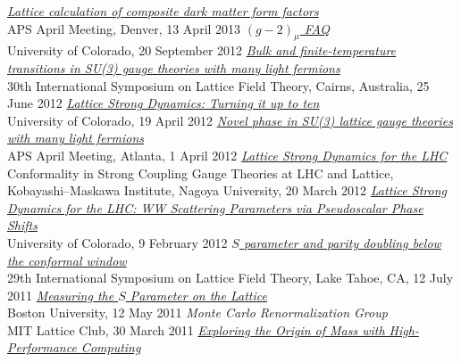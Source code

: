 \begin{spacelist}
\begin{revnumerate}
    \pagebreakitem
      \textit{\href{http://www.davidschaich.net/talks/April13.pdf}{Lattice calculation of composite dark matter form factors}} \\
      APS April Meeting, Denver, 13 April 2013
    \pagebreakitem
      \textit{\href{http://www.davidschaich.net/talks/g-2_1209.pdf}{$(g - 2)_{\mu}$ FAQ}} \\
      University of Colorado, 20 September 2012
    \pagebreakitem
      \textit{\href{http://www.davidschaich.net/talks/lattice12.pdf}{Bulk and finite-temperature transitions in SU(3) gauge theories with many light fermions}} \\
      30th International Symposium on Lattice Field Theory, Cairns, Australia, 25 June 2012
    \pagebreakitem
      \textit{\href{http://www.davidschaich.net/talks/LSD10f_1204.pdf}{Lattice Strong Dynamics: Turning it up to ten}} \\
      University of Colorado, 19 April 2012
    \pagebreakitem
      \textit{\href{http://www.davidschaich.net/talks/April12}{Novel phase in SU(3) lattice gauge theories with many light fermions}} \\
      APS April Meeting, Atlanta, 1 April 2012
    \pagebreakitem
      \textit{\href{http://www.davidschaich.net/talks/SCGT12Mini.pdf}{Lattice Strong Dynamics for the LHC}} \\
      Conformality in Strong Coupling Gauge Theories at LHC and Lattice, \\ Kobayashi--Maskawa Institute, Nagoya University, 20 March 2012
    \pagebreakitem
      \textit{\href{http://www.davidschaich.net/talks/1202WW.pdf}{Lattice Strong Dynamics for the LHC: WW Scattering Parameters via Pseudoscalar Phase Shifts}} \\
      University of Colorado, 9 February 2012
    \pagebreakitem
      \textit{\href{http://www.davidschaich.net/talks/Lattice11.pdf}{$S$ parameter and parity doubling below the conformal window}} \\
      29th International Symposium on Lattice Field Theory, Lake Tahoe, CA, 12 July 2011
    \pagebreakitem
      \textit{\href{http://www.davidschaich.net/talks/defense.pdf}{Measuring the $S$ Parameter on the Lattice}} \\
      Boston University, 12 May 2011
    \pagebreakitem
      \textit{Monte Carlo Renormalization Group} \\
      MIT Lattice Club, 30 March 2011
    \pagebreakitem
      \textit{\href{http://www.davidschaich.net/talks/BUseminar.pdf}{Exploring the Origin of Mass with High-Performance Computing}} \\

\end{revnumerate}
\end{spacelist}
